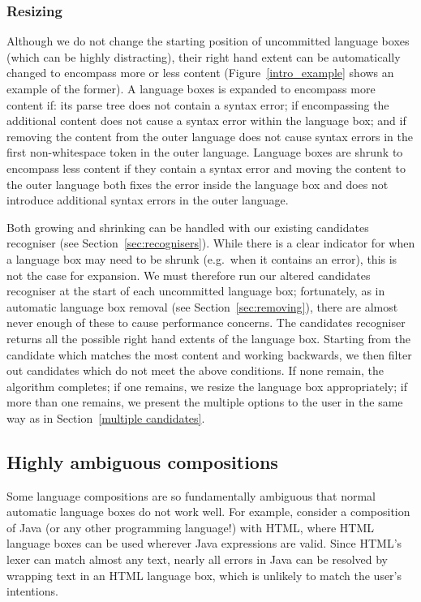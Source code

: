 \documentclass[sigplan,screen]{acmart}\settopmatter{printfolios=true,printccs=false,printacmref=false}
\begin{document}
\subsubsection{Resizing}

Although we do not change the starting position of uncommitted language boxes
(which can be highly distracting), their right hand extent can be automatically
changed to encompass more or less content (Figure~\ref{intro_example} shows an
example of the former). A language boxes is expanded to encompass more content
if: its parse tree does not contain a syntax error; if encompassing the
additional content does not cause a syntax error within the language box; and
if removing the content from the outer language does not cause syntax errors in
the first non-whitespace token in the outer language.
Language boxes are shrunk to encompass less content if they
contain a syntax error and moving the content to the outer language both
fixes the error inside the language box and does not
introduce additional syntax errors in the outer language.

Both growing and shrinking can be handled with our existing
candidates recogniser (see Section~\ref{sec:recognisers}).
While there is a clear indicator for when a language box may need to be shrunk
(e.g.~when it contains an error), this is not the case for expansion. We
must therefore run our altered candidates recogniser at the start of
each uncommitted language box; fortunately, as in automatic language box
removal (see Section~\ref{sec:removing}), there are almost never enough of
these to cause performance concerns. The candidates recogniser
returns all the possible right hand extents of the language box. Starting
from the candidate which matches the most content and working backwards, we then
filter out candidates which do not meet the above conditions. If none remain,
the algorithm completes; if one remains,
we resize the language box appropriately; if more than one remains, we present
the multiple options to the user in the same way as in Section~\ref{multiple candidates}.


\subsection{Highly ambiguous compositions}
\label{sec:highly ambiguous compositions}

Some language compositions are so fundamentally ambiguous that normal automatic
language boxes do not work well. For example, consider a composition of Java
(or any other programming language!) with HTML, where HTML language boxes can
be used wherever Java expressions are valid. Since HTML's lexer can match
almost any text, nearly all errors in Java can be resolved by wrapping text in
an HTML language box, which is unlikely to match the user's intentions.
\end{document}
